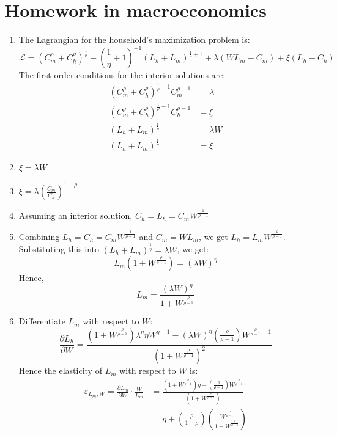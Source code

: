 \documentclass[11pt]{amsart}
\begin{document}
\section{Homework in macroeconomics}
\begin{enumerate}[label = (\alph*)]
	\item The Lagrangian for the household's maximization problem is:
	\begin{equation*}
	\mathcal{L} = \left( C_m^\rho + C_h^\rho \right)^{\frac{1}{\rho}} - \left( \frac{1}{\eta} + 1 \right)^{-1} \left(  L_h + L_m \right)^{\frac{1}{\eta} + 1} + \lambda \left( W L_m - C_m \right) + \xi \left(L_h - C_h \right)
	\end{equation*}
	The first order conditions for the interior solutions are:
	\begin{align*}
	\left( C_m^\rho + C_h^\rho \right)^{\frac{1}{\rho} -1} C_m^{\rho-1} &= \lambda \\
	\left( C_m^\rho + C_h^\rho \right)^{\frac{1}{\rho} -1} C_h^{\rho-1} & = \xi \\
	\left(  L_h + L_m \right)^{\frac{1}{\eta} }  &=\lambda W \\
	\left(  L_h + L_m \right)^{\frac{1}{\eta} }  &= \xi 	 
	\end{align*}
	\item $\xi = \lambda W $
	\item $\xi = \lambda \left( \frac{C_m}{C_h} \right)^{1-\rho}$ \\
	\item Assuming an interior solution, $C_h = L_h = C_m W^{\frac{1}{\rho-1}}$
	\item Combining $L_h = C_h = C_m W^{\frac{1}{\rho-1}}$ and $C_m = W L_m$, we get $L_h = L_m W^{\frac{\rho}{\rho-1}}$. Substituting this into $\left(  L_h + L_m \right)^{\frac{1}{\eta} }  =\lambda W$, we get:
	\begin{equation*}
	L_m \left( 1 + W^{\frac{\rho}{\rho-1}} \right) = \left( \lambda W \right)^\eta
	\end{equation*}
	Hence, 
	\begin{equation*}
	L_m = \frac{(\lambda W)^\eta}{1 + W^{\frac{\rho}{\rho-1}}}
	\end{equation*}
	
	\item Differentiate $L_m$ with respect to $W$:
	\begin{equation*}
	\frac{\partial L_h}{\partial W} = \frac{(1 + W^{\frac{\rho}{\rho-1}}) \lambda^{\eta} \eta W^{\eta - 1} - (\lambda W)^{\eta} (\frac{\rho}{\rho-1}) W^{\frac{\rho}{\rho-1} - 1}}{(1 + W^{\frac{\rho}{\rho-1}})^2}
	\end{equation*}
	Hence the elasticity of $L_m$ with respect to $W$ is: 
	\begin{align*}
	\varepsilon_{L_m,W} = \frac{\partial L_m}{\partial W} \cdot \frac{W}{L_m} &= \frac{(1 + W^{\frac{\rho}{\rho-1}}) \eta  -  (\frac{\rho}{\rho-1}) W^{\frac{\rho}{\rho-1}}}{(1 + W^{\frac{\rho}{\rho-1}})} \\
	&= \eta + \left( \frac{\rho}{1-\rho} \right) \left( \frac{W^{\frac{\rho}{\rho-1}}}{1 + W^{\frac{\rho}{\rho-1}}} \right) 
	\end{align*}
	

\end{enumerate}
\end{document}
